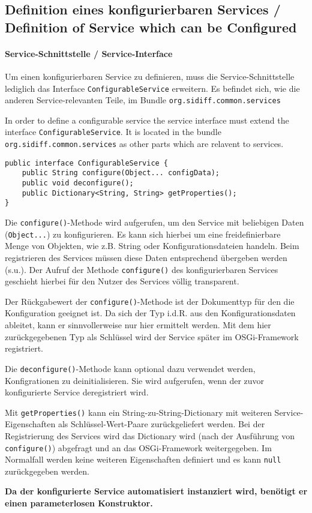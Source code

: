 \documentclass[10pt,a4paper]{scrartcl}
\providecommand{\deng}[2]{#1 / {\sffamily #2}}
\providecommand{\deutsch}[1]{#1}
\providecommand{\englisch}[1]{{\sffamily #1}}
\begin{document}
\subsection{\deng{Definition eines konfigurierbaren Services}{Definition of Service which can be Configured}}
\paragraph{\deng{Service-Schnittstelle}{Service-Interface}}
\deutsch{Um einen konfigurierbaren Service zu definieren, muss die Service-Schnittstelle
lediglich das Interface \texttt{ConfigurableService} erweitern. Es befindet
sich, wie die anderen Service-relevanten Teile, im Bundle 
\texttt{org.sidiff.common.services}}

\englisch{In order to define a configurable service the service interface must extend the interface \texttt{ConfigurableService}. It is located in the bundle \texttt{org.sidiff.common.services} as other parts which are relavent to services.}

\begin{lstlisting}
public interface ConfigurableService {
	public String configure(Object... configData);
	public void deconfigure();
	public Dictionary<String, String> getProperties();
}
\end{lstlisting}

\deutsch{Die \texttt{configure()}-Methode wird aufgerufen, um den Service mit 
beliebigen Daten (\texttt{Object...}) zu konfigurieren. Es kann sich hierbei
um eine freidefinierbare Menge von Objekten, wie z.B. String oder 
Konfigurationsdateien handeln. Beim registrieren des Services müssen diese
Daten entsprechend übergeben werden (s.u.).
Der Aufruf der Methode \texttt{configure()} des konfigurierbaren Services geschieht hierbei
für den Nutzer des Services völlig transparent.

Der Rückgabewert der \texttt{configure()}-Methode ist der Dokumenttyp für
den die Konfiguration geeignet ist. Da sich der Typ i.d.R. aus den
Konfigurationsdaten ableitet, kann er sinnvollerweise nur hier ermittelt werden.
Mit dem hier zurückgegebenen Typ als Schlüssel wird der Service später im 
OSGi-Framework registriert.

Die \texttt{deconfigure()}-Methode kann optional dazu verwendet werden,
Konfigrationen zu deinitialisieren. Sie wird aufgerufen, wenn der zuvor
konfigurierte Service deregistriert wird.

Mit \texttt{getProperties()} kann ein String-zu-String-Dictionary mit weiteren
Service-Eigenschaften als Schlüssel-Wert-Paare zurückgeliefert werden. Bei der
Registrierung des Services wird das Dictionary wird (nach der Ausführung von
\texttt{configure()}) abgefragt und an das OSGi-Framework weitergegeben. Im
Normalfall werden keine weiteren Eigenschaften definiert und es kann
\texttt{null} zurückgegeben werden.

\textbf{Da der konfigurierte Service automatisiert instanziert wird, benötigt er
einen parameterlosen Konstruktor.}}
\end{document}
